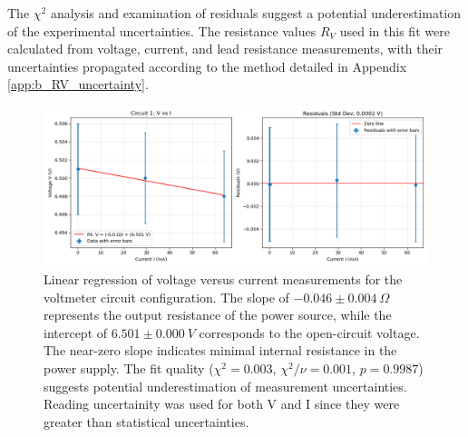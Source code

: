 \documentclass{article} %
\begin{document}
The $\chi^2$ analysis and examination of residuals suggest a potential underestimation of the experimental uncertainties. 
The resistance values $R_V$ used in this fit were calculated from voltage, current, and lead resistance measurements, with their uncertainties propagated according to the method detailed in Appendix \ref{app:b_RV_uncertainty}.
\begin{figure}[htbp]            %
  \centering
  \includegraphics[width=1\linewidth]{Figs/Circuit_1.png}
\caption{Linear regression of voltage versus current measurements for the voltmeter circuit configuration. 
                The slope of $-0.046 \pm 0.004~\Omega$ represents the output resistance of the power source, while the intercept of $6.501 \pm 0.000~V$ corresponds to the open-circuit voltage. 
                The near-zero slope indicates minimal internal resistance in the power supply. 
                The fit quality ($\chi^2 = 0.003$, $\chi^2/\nu = 0.001$, $p = 0.9987$) suggests potential underestimation of measurement uncertainties.
                Reading uncertainity was used for both V and I since they were greater than statistical uncertainties.}    
                \label{fig:circuit_1_fit}
\end{figure}

\newpage
\end{document}
